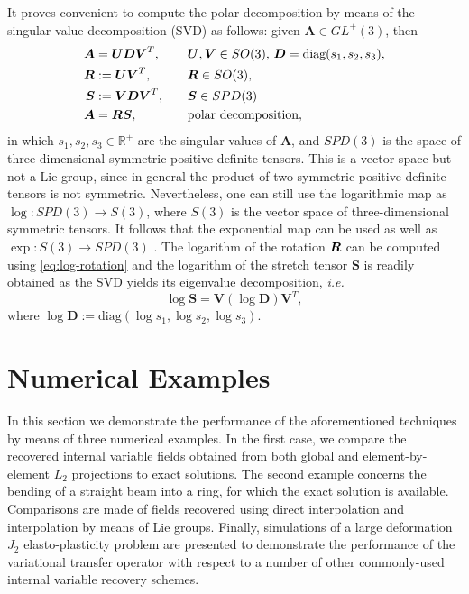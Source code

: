 \documentclass[12pt]{article}
\newcommand{\mbs}[1]{\boldsymbol{#1}}
\newcommand{\mbb}[1]{\mathbb{#1}}
\def\bA{{\mbs{A}}} \def\bB{{\mbs{B}}} \def\bC{{\mbs{C}}}
\def\bD{{\mbs{D}}} \def\bE{{\mbs{E}}} \def\bF{{\mbs{F}}}
\def\bS{{\mbs{S}}} \def\bT{{\mbs{T}}} \def\bU{{\mbs{U}}}
\def\bV{{\mbs{V}}} \def\bW{{\mbs{W}}} \def\bX{{\mbs{X}}}
\begin{document}
It proves convenient to compute the polar decomposition by means of
the singular value decomposition (SVD) as follows: given $\bA \in
GL^+(3)$, then
\begin{align}
  \bA & = \bU \bD \bV^T, & \quad & \bU, \bV \in SO(3), \,
  \bD = \text{diag}(s_1,s_2,s_3), \label{eq:SVD-polar-1}
  \\
  \bR & := \bU \bV^T, & \quad & \bR \in SO(3),
  \\
  \bS & := \bV \bD \bV^T, & \quad & \bS \in SPD(3)
  \\
  \bA & = \bR \bS, & \quad
  & \text{polar decomposition}, \label{eq:SVD-polar-4}
\end{align}
in which $s_1,s_2,s_3 \in \mbb{R}^+$ are the singular values of $\bA$,
and $SPD(3)$ is the space of three-dimensional symmetric positive
definite tensors. This is a vector space but not a Lie group, since in
general the product of two symmetric positive definite tensors is not
symmetric. Nevertheless, one can still use the logarithmic map as
$\log: SPD(3) \rightarrow S(3)$, where $S(3)$ is the vector space of
three-dimensional symmetric tensors. It follows that the exponential
map can be used as well as $\exp: S(3) \rightarrow SPD(3)$
\citep{Gallier:2011}. The logarithm of the rotation $\bR$ can be
computed using \eqref{eq:log-rotation} and the logarithm of the
stretch tensor $\bS$ is readily obtained as the SVD yields its
eigenvalue decomposition, \emph{i.e.}
\begin{equation}
  \log \bS = \bV (\log \bD) \bV^T,
  \label{eq:log-stretch}
\end{equation}
where
$\log \bD := \text{diag}(\log s_1, \log s_2, \log s_3)$.

\section{Numerical Examples}

In this section we demonstrate the performance of the aforementioned techniques
by means of three numerical examples. In the first case, we compare the
recovered internal variable fields obtained from both global and
element-by-element $L_2$ projections to exact solutions. The second example
concerns the bending of a straight beam into a ring, for which the exact
solution is available. Comparisons are made of fields recovered using direct
interpolation and interpolation by means of Lie groups. Finally, simulations of
a large deformation $J_2$ elasto-plasticity problem are presented to demonstrate
the performance of the variational transfer operator with respect to a number of
other commonly-used internal variable recovery schemes.
\end{document}
